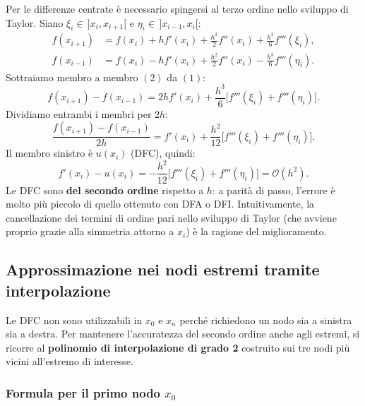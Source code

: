 \documentclass[a4paper,12pt]{article}
\theoremstyle{definition}
\theoremstyle{remark}
\begin{document}
Per le differenze centrate è necessario spingersi al terzo ordine nello
sviluppo di Taylor.
Siano $\xi_i \in \,]x_i, x_{i+1}[$ e $\eta_i \in \,]x_{i-1}, x_i[$:
\begin{align}
  f(x_{i+1}) &= f(x_i) + h f'(x_i) + \frac{h^2}{2} f''(x_i)
               + \frac{h^3}{6} f'''(\xi_i), \tag{1}\\
  f(x_{i-1}) &= f(x_i) - h f'(x_i) + \frac{h^2}{2} f''(x_i)
               - \frac{h^3}{6} f'''(\eta_i). \tag{2}
\end{align}
Sottraiamo membro a membro $(2)$ da $(1)$:
\[
  f(x_{i+1}) - f(x_{i-1}) = 2h f'(x_i) + \frac{h^3}{6}
  \bigl[f'''(\xi_i) + f'''(\eta_i)\bigr].
\]
Dividiamo entrambi i membri per $2h$:
\[
  \frac{f(x_{i+1}) - f(x_{i-1})}{2h}
  = f'(x_i) + \frac{h^2}{12}\bigl[f'''(\xi_i) + f'''(\eta_i)\bigr].
\]
Il membro sinistro è $u(x_i)$ (DFC), quindi:
\[
  f'(x_i) - u(x_i)
  = -\frac{h^2}{12}\bigl[f'''(\xi_i) + f'''(\eta_i)\bigr]
  = \mathcal{O}(h^2).
\]
Le DFC sono \textbf{del secondo ordine} rispetto a $h$: a parità di passo,
l'errore è molto più piccolo di quello ottenuto con DFA o DFI.
Intuitivamente, la cancellazione dei termini di ordine pari nello sviluppo
di Taylor (che avviene proprio grazie alla simmetria attorno a $x_i$) è
la ragione del miglioramento.

\subsection{Approssimazione nei nodi estremi tramite interpolazione}

Le DFC non sono utilizzabili in $x_0$ e $x_n$ perché richiedono un nodo
sia a sinistra sia a destra.
Per mantenere l'accuratezza del secondo ordine anche agli estremi, si ricorre
al \textbf{polinomio di interpolazione di grado 2} costruito sui tre nodi più
vicini all'estremo di interesse.

\subsubsection{Formula per il primo nodo \texorpdfstring{$x_0$}{x0}}
\end{document}
